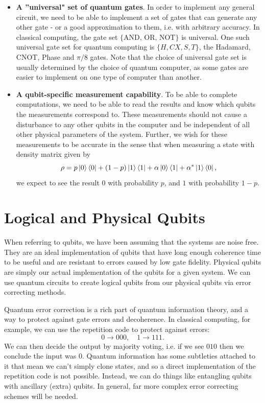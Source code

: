 \documentclass{article}
\theoremstyle{definition}
\begin{document}
\begin{itemize}
    \item \textbf{A ''universal" set of quantum gates}. In order to implement any general circuit, we need to be able to implement a set of gates that can generate any other gate - or a good approximation to them, i.e. with arbitrary accuracy. In classical computing, the gate set $\{\text{AND, OR, NOT} \}$ is universal. One such universal gate set for quantum computing is $\{H, CX, S, T\}$, the Hadamard, CNOT, Phase and $\pi/8$ gates. Note that the choice of universal gate set is usually determined by the choice of quantum computer, as some gates are easier to implement on one type of computer than another.
    
    \item \textbf{A qubit-specific measurement capability}. To be able to complete computations, we need to be able to read the results and know which qubits the measurements correspond to. These measurements should not cause a disturbance to any other qubits in the computer and be independent of all other physical parameters of the system. Further, we wish for these measurements to be accurate in the sense that when measuring a state with density matrix given by
    \[
    \rho = p \ket{0} \bra{0} + (1 -p) \ket{1} \bra{1} + \alpha \ket{0} \bra{1} + \alpha ^\ast \ket{1} \bra{0},
    \]
    we expect to see the result $0$ with probability $p$, and $1$ with probability $ 1-p$.
\end{itemize} 

\section{Logical and Physical Qubits}
When referring to qubits, we have been assuming that the systems are noise free. They are an ideal implementation of qubits that have long enough coherence time to be useful and are resistant to errors caused by low gate fidelity. Physical qubits are simply our actual implementation of the qubits for a given system. We can use quantum circuits to create logical qubits from our physical qubits via error correcting methods. 

Quantum error correction is a rich part of quantum information theory, and a way to protect against gate errors and decoherence. In classical computing, for example, we can use the repetition code to protect against errors:
\[
0  \to 000, \quad 1 \to 111.
\]
We can then decide the output by majority voting, i.e. if we see $010$ then we conclude the input was $0$. Quantum information has some subtleties attached to it that mean we can't simply clone states, and so a direct implementation of the repetition code is not possible. Instead, we can do things like entangling qubits with ancillary (extra) qubits. In general, far more complex error correcting schemes will be needed.
\end{document}
